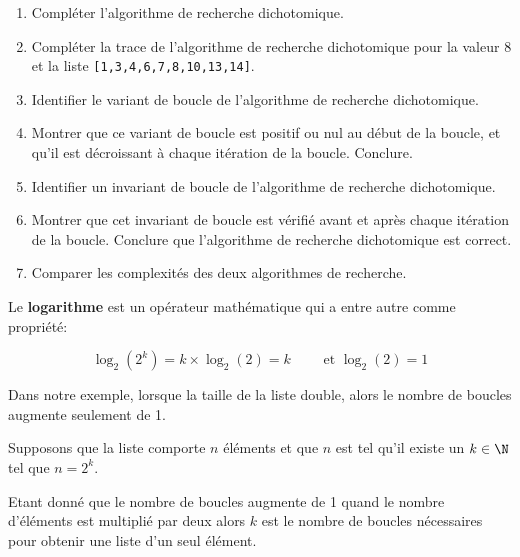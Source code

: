 \begin{exercice_cours}{}
	\begin{enumerate}
		\item Compléter l'algorithme de recherche dichotomique.
		\item Compléter la trace de l'algorithme de recherche dichotomique pour la valeur 8 et la liste \verb+[1,3,4,6,7,8,10,13,14]+.
		\item Identifier le variant de boucle de l'algorithme de recherche dichotomique.
		\item Montrer que ce variant de boucle est positif ou nul au début de la boucle, et qu'il est décroissant à chaque itération de la boucle. Conclure.
		\item Identifier un invariant de boucle de l'algorithme de recherche dichotomique.
		\item Montrer que cet invariant de boucle est vérifié avant et après chaque itération de la boucle. Conclure que l'algorithme de recherche dichotomique est correct.
		\item Comparer les complexités des deux algorithmes de recherche.
	\end{enumerate}
\end{exercice_cours}


\begin{definition}[Le logarithme]
	Le \textbf{logarithme} est un opérateur mathématique qui a entre autre comme propriété:

	\[
	\log_2(2^k) = k \times \log_2(2)=k \qquad \textrm{ et } \log_2(2) = 1
	\]
\end{definition}

	Dans notre exemple, lorsque la taille de la liste double, alors le nombre de boucles augmente seulement de 1.

	Supposons que la liste comporte $n$ éléments et que $n$ est tel qu'il existe un $k\in\N$ tel que $n=2^k$.

	Etant donné que le nombre de boucles augmente de 1 quand le nombre d'éléments est multiplié par deux alors $k$ est le nombre de boucles nécessaires pour obtenir une liste d'un seul élément.
	
\smallskip

